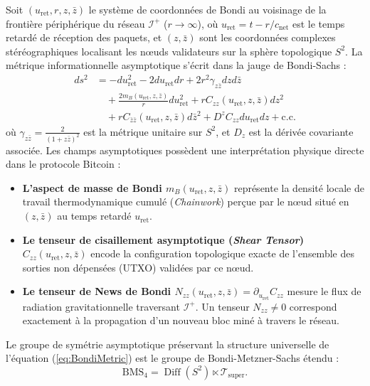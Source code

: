 \documentclass[10pt,twocolumn,a4paper]{article}
\theoremstyle{plain}
\theoremstyle{definition}
\theoremstyle{remark}
\newcommand{\scri}{\mathcal{I}}
\newcommand{\Diff}{\operatorname{Diff}}
\newcommand{\uRet}{u_{\text{ret}}}
\begin{document}
Soit $(\uRet, r, z, \bar{z})$ le système de coordonnées de Bondi au voisinage de la frontière périphérique du réseau $\scri^+$ ($r \to \infty$), où $\uRet = t - r/c_{\text{net}}$ est le temps retardé de réception des paquets, et $(z, \bar{z})$ sont les coordonnées complexes stéréographiques localisant les nœuds validateurs sur la sphère topologique $S^2$. La métrique informationnelle asymptotique s'écrit dans la jauge de Bondi-Sachs :
\begin{equation}
\begin{split}
    ds^2 &= -d\uRet^2 - 2 d\uRet dr + 2 r^2 \gamma_{z\bar{z}} dz d\bar{z} \\
    &\quad + \frac{2 m_B(\uRet, z, \bar{z})}{r} d\uRet^2 + r C_{zz}(\uRet, z, \bar{z}) dz^2 \\
    &\quad + r C_{\bar{z}\bar{z}}(\uRet, z, \bar{z}) d\bar{z}^2 + D^z C_{zz} d\uRet dz + \text{c.c.}
\end{split}
\label{eq:BondiMetric}
\end{equation}
où $\gamma_{z\bar{z}} = \frac{2}{(1 + z\bar{z})^2}$ est la métrique unitaire sur $S^2$, et $D_z$ est la dérivée covariante associée. Les champs asymptotiques possèdent une interprétation physique directe dans le protocole Bitcoin :
\begin{itemize}
    \item \textbf{L'aspect de masse de Bondi $m_B(\uRet, z, \bar{z})$} représente la densité locale de travail thermodynamique cumulé (\textit{Chainwork}) perçue par le nœud situé en $(z, \bar{z})$ au temps retardé $\uRet$.
    \item \textbf{Le tenseur de cisaillement asymptotique (\textit{Shear Tensor}) $C_{zz}(\uRet, z, \bar{z})$} encode la configuration topologique exacte de l'ensemble des sorties non dépensées (UTXO) validées par ce nœud.
    \item \textbf{Le tenseur de News de Bondi $N_{zz}(\uRet, z, \bar{z}) = \partial_{\uRet} C_{zz}$} mesure le flux de radiation gravitationnelle traversant $\scri^+$. Un tenseur $N_{zz} \neq 0$ correspond exactement à la propagation d'un nouveau bloc miné à travers le réseau.
\end{itemize}

Le groupe de symétrie asymptotique préservant la structure universelle de l'équation (\ref{eq:BondiMetric}) est le groupe de Bondi-Metzner-Sachs étendu :
\begin{equation}
    \text{BMS}_4 = \Diff(S^2) \ltimes \mathcal{T}_{\text{super}}.
    \label{eq:BMSGroup}
\end{equation}
\end{document}
